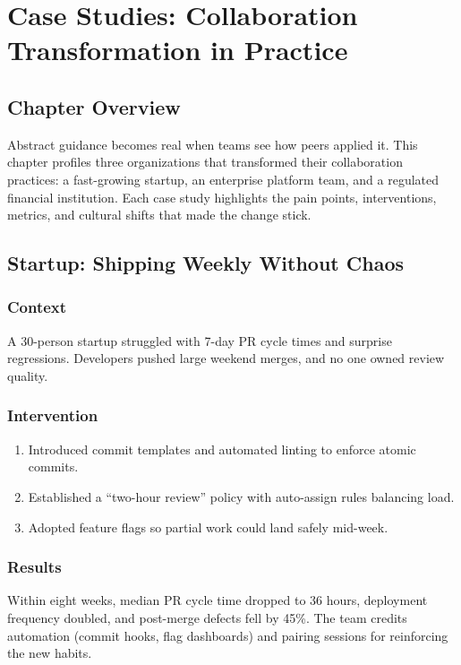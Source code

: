\chapter{Case Studies: Collaboration Transformation in Practice}

\section{Chapter Overview}
Abstract guidance becomes real when teams see how peers applied it. This chapter profiles three organizations that transformed their collaboration practices: a fast-growing startup, an enterprise platform team, and a regulated financial institution. Each case study highlights the pain points, interventions, metrics, and cultural shifts that made the change stick.

\section{Startup: Shipping Weekly Without Chaos}
\subsection{Context}
A 30-person startup struggled with 7-day PR cycle times and surprise regressions. Developers pushed large weekend merges, and no one owned review quality.

\subsection{Intervention}
\begin{enumerate}
  \item Introduced commit templates and automated linting to enforce atomic commits.
  \item Established a ``two-hour review'' policy with auto-assign rules balancing load.
  \item Adopted feature flags so partial work could land safely mid-week.
\end{enumerate}

\subsection{Results}
Within eight weeks, median PR cycle time dropped to 36 hours, deployment frequency doubled, and post-merge defects fell by 45\%. The team credits automation (commit hooks, flag dashboards) and pairing sessions for reinforcing the new habits.

